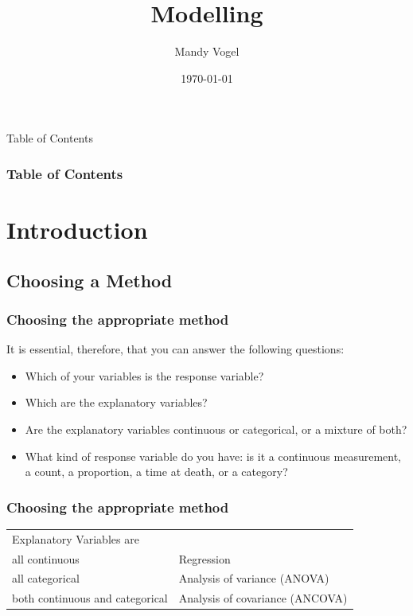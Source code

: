 \documentclass[xcolor={table},handout]{beamer}
\begin{document}
\title{Modelling}   
\author{Mandy Vogel} 
\date{\today}


\begin{frame}
\titlepage
\end{frame}

\begin{frame}{Table of Contents}
\frametitle{Table of Contents}\tableofcontents
\end{frame}

\section{Introduction}
\subsection{Choosing a Method}
\begin{frame}\frametitle{Choosing the appropriate method}
It is essential, therefore, that you can answer the following questions:
\begin{itemize}
\item Which of your variables is the response variable?
\item Which are the explanatory variables?
\item Are the explanatory variables continuous or categorical, or a mixture of both?
\item What kind of response variable do you have: is it a continuous measurement, a count, a proportion, a time at death, or a category?
\end{itemize}
\end{frame}

\begin{frame}\frametitle{Choosing the appropriate method}
\begin{center}\small
  \begin{tabular}{@{} >{\ttfamily}l l} 
    \rowcolor{gray!40}
Explanatory Variables are & \\
all  continuous                  & Regression                     \\ 
all categorical & Analysis of variance (ANOVA)   \\
both continuous and categorical & Analysis of covariance (ANCOVA)\\
  \end{tabular}
\end{center}
\end{frame}
\end{document}
